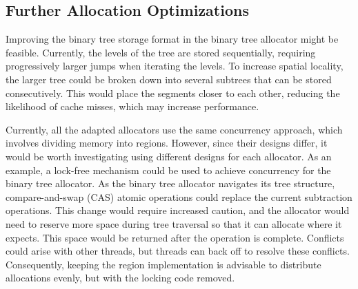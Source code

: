 \subsection{Further Allocation Optimizations}


Improving the binary tree storage format in the binary tree allocator might be feasible. Currently, the levels of the tree are stored sequentially, requiring progressively larger jumps when iterating the levels. To increase spatial locality, the larger tree could be broken down into several subtrees that can be stored consecutively. This would place the segments closer to each other, reducing the likelihood of cache misses, which may increase performance.

Currently, all the adapted allocators use the same concurrency approach, which involves dividing memory into regions. However, since their designs differ, it would be worth investigating using different designs for each allocator. As an example, a lock-free mechanism could be used to achieve concurrency for the binary tree allocator. As the binary tree allocator navigates its tree structure, compare-and-swap (CAS) atomic operations could replace the current subtraction operations. This change would require increased caution, and the allocator would need to reserve more space during tree traversal so that it can allocate where it expects. This space would be returned after the operation is complete. Conflicts could arise with other threads, but threads can back off to resolve these conflicts. Consequently, keeping the region implementation is advisable to distribute allocations evenly, but with the locking code removed.

% 

